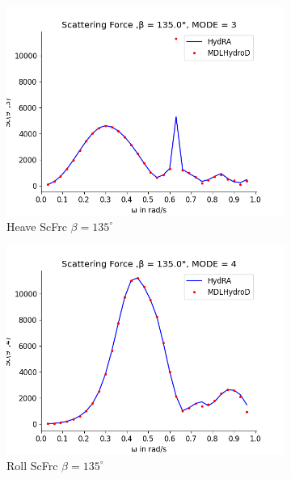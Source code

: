 \begin{figure}[H]
    \vspace{5pt}%
    \begin{subfigure}[b]{0.49\textwidth}
        \includegraphics[width=\textwidth]{plots/kvlcc/sc/sc3.png}
        \caption{Heave ScFrc $\beta = 135^{\circ}$}
    \end{subfigure}
    \begin{subfigure}[b]{0.49\textwidth}
        \includegraphics[width=\textwidth]{plots/kvlcc/sc/sc4.png}
        \caption{Roll ScFrc $\beta = 135^{\circ}$}
    \end{subfigure}
    \vspace{5pt}%
    \begin{subfigure}[b]{0.49\textwidth}

\end{subfigure}
\end{figure}
